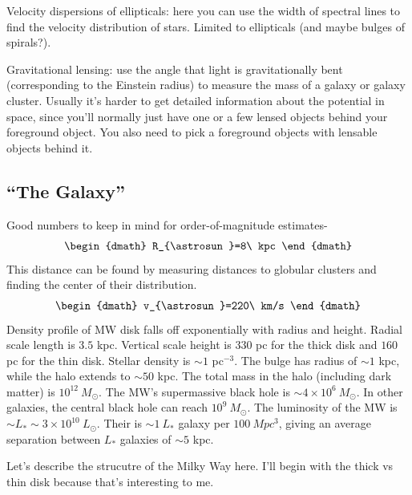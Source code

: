 \begin{enumerate}
      Velocity dispersions of ellipticals: here you can use the width of spectral lines to find the velocity distribution of stars. Limited to ellipticals (and maybe bulges of spirals?).
      
      Gravitational lensing: use the angle that light is gravitationally bent (corresponding to the Einstein radius) to measure the mass of a galaxy or galaxy cluster. Usually it's harder to get detailed information about the potential in space, since you'll normally just have one or a few lensed objects behind your foreground object. You also need to pick a foreground objects with lensable objects behind it.
      
\end{enumerate}

\subsection{``The Galaxy''}

Good numbers to keep in mind for order-of-magnitude estimates-
\begin{dgroup}
\begin{dmath}
R_{\astrosun}=8\ kpc
\end{dmath}
\end{dgroup}
This distance can be found by measuring distances to globular clusters and 
finding the center of their distribution.
\begin{dgroup}
\begin{dmath}
v_{\astrosun}=220\ km/s
\end{dmath}
\end{dgroup}
Density profile of MW disk falls off exponentially with radius and height.  
Radial scale length is $3.5$ kpc.  Vertical scale height is $330$ pc for the 
thick disk and $160$ pc for the thin disk.  Stellar density is $\sim1$ 
pc$^{-3}$.  The bulge has radius of $\sim1$ kpc, while the halo extends to 
$\sim50$ kpc.  The total mass in the halo (including dark matter) is 
$10^12\ M_{\odot}$.  The MW's supermassive black hole is 
$\sim4\times10^6\ M_{\odot}$.  In other galaxies, the central black hole can 
reach $10^9\ M_{\odot}$.  The luminosity of the MW is 
$\sim L_*\sim3\times10^{10}\ L_{\odot}$.  Their is $\sim1\ L_*$ galaxy per 
$100\ Mpc^3$, giving an average separation between $L_*$ galaxies of 
$\sim5$ kpc.  

Let's describe the strucutre of the Milky Way here.  I'll begin with the thick vs thin disk
because that's interesting to me.

